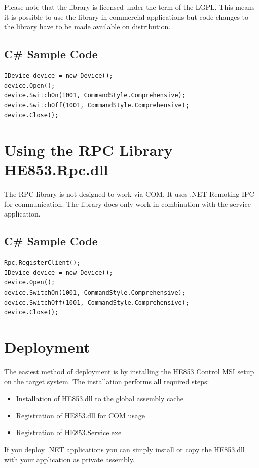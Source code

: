 \documentclass[
a4paper,
oneside,
halfparskip*,
normalheadings,
]
{scrbook}
\begin{document}
Please note that the library is licensed under the term of the LGPL. This means it is
possible to use the library in commercial applications but code changes to the library
have to be made available on distribution.

\subsection{C\# Sample Code}

\begin{verbatim}
IDevice device = new Device();
device.Open();
device.SwitchOn(1001, CommandStyle.Comprehensive);
device.SwitchOff(1001, CommandStyle.Comprehensive);
device.Close();
\end{verbatim}

\section{Using the RPC Library -- HE853.Rpc.dll}

The RPC library is not designed to work via COM. It uses .NET Remoting IPC for
communication. The library does only work in combination with the service
application.

\subsection{C\# Sample Code}

\begin{verbatim}
Rpc.RegisterClient();
IDevice device = new Device();
device.Open();
device.SwitchOn(1001, CommandStyle.Comprehensive);
device.SwitchOff(1001, CommandStyle.Comprehensive);
device.Close();
\end{verbatim}

\section{Deployment}
The easiest method of deployment is by installing the HE853 Control MSI setup on the target
system. The installation performs all required steps:

\begin{itemize}
  \item Installation of HE853.dll to the global assembly cache
	\item Registration of HE853.dll for COM usage
	\item Registration of HE853.Service.exe
\end{itemize}

If you deploy .NET applications you can simply install or copy the HE853.dll with your application
as private assembly.
\end{document}
